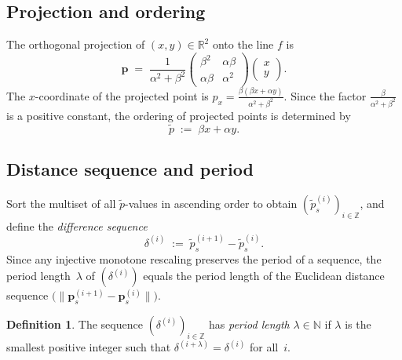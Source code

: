 \documentclass[11pt]{article}
\theoremstyle{plain}
\theoremstyle{definition}
\newtheorem{definition}[theorem]{Definition}
\theoremstyle{remark}
\begin{document}
\subsection{Projection and ordering}\label{subsec:projection}

The orthogonal projection of $(x, y) \in \mathbb{R}^2$ onto the line $f$ is
\begin{equation}\label{eq:projection}
    \mathbf{p} \;=\;
    \frac{1}{\alpha^2 + \beta^2}
    \begin{pmatrix}
        \beta^2 & \alpha\beta \\
        \alpha\beta & \alpha^2
    \end{pmatrix}
    \begin{pmatrix} x \\ y \end{pmatrix}.
\end{equation}
The $x$-coordinate of the projected point is
$p_x = \frac{\beta(\beta x + \alpha y)}{\alpha^2 + \beta^2}$.
Since the factor $\frac{\beta}{\alpha^2+\beta^2}$ is a positive constant,
the ordering of projected points is determined by
\begin{equation}\label{eq:ptilde}
    \tilde{p} \;:=\; \beta x + \alpha y.
\end{equation}

\subsection{Distance sequence and period}\label{subsec:distance}

Sort the multiset of all $\tilde{p}$-values in ascending order to obtain
$(\tilde{p}^{(i)}_s)_{i \in \mathbb{Z}}$, and define the
\emph{difference sequence}
\begin{equation}\label{eq:delta}
    \delta^{(i)} \;:=\; \tilde{p}^{(i+1)}_s - \tilde{p}^{(i)}_s.
\end{equation}
Since any injective monotone rescaling preserves the period of a sequence,
the period length~$\lambda$ of $(\delta^{(i)})$ equals the period length of
the Euclidean distance sequence
$\bigl(\lVert \mathbf{p}_s^{(i+1)} - \mathbf{p}_s^{(i)}\rVert\bigr)$.

\begin{definition}\label{def:period}
The sequence $(\delta^{(i)})_{i \in \mathbb{Z}}$ has \emph{period length}
$\lambda \in \mathbb{N}$ if $\lambda$ is the smallest positive integer such
that $\delta^{(i+\lambda)} = \delta^{(i)}$ for all~$i$.
\end{definition}
\end{document}
